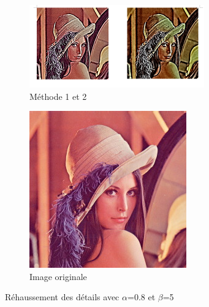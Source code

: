 \documentclass[twoside,UTF8]{EPURapport}
\begin{document}
\begin{figure}
        \centering
        \begin{subfigure}[b]{0.3\textwidth}
                \includegraphics[]{images/lena_08_5.png} 
                \caption{Méthode 1 et 2}
        \end{subfigure}
        
        \begin{subfigure}[b]{0.3\textwidth}
                \includegraphics[scale=0.5]{images/lena.jpg}
             	\caption{Image originale}
        \end{subfigure}
        \caption{Réhaussement des détails avec $\alpha$=0.8 et $\beta$=5}
\end{figure}

%
%
\end{document}
